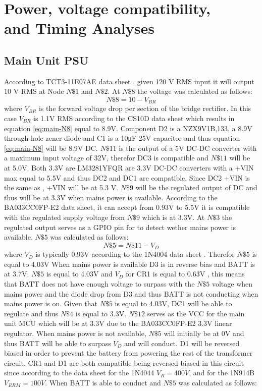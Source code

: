 \section{Power, voltage compatibility,\\ and Timing Analyses}
\subsection{Main Unit PSU}
According to TCT3-11E07AE data sheet \cite{TCT311E07AETriadMagnetics}, given 120 V RMS input it will output 10 V RMS at Node $N\$1$ and $N\$2$. At $N\$8$ the voltage was calculated as follows:
\begin{equation}
  N\$8 = 10 - V_{BR}
  \label{eq:main-N8}
\end{equation}
where $V_{BR}$ is the forward voltage drop per section of the bridge rectifier. In this case $V_{BR}$ is \num{1.1}\si{\V} RMS according to the CS10D data sheet \cite{CS10D} which results in equation \ref{eq:main-N8} equal to 8.9\si{\V}. Component D2 is a NZX9V1B,133, a 8.9\si{V} through hole zener diode and C1 is a 10\si{\micro\farad} 25V capacitor and thus equation \ref{eq:main-N8} will be 8.9\si{\V} DC. $N\$11$ is the output of a 5\si{\V} DC-DC converter with a maximum input voltage of 32\si{\V}, therefor DC3 is compatible and $N\$11$ will be at 5.0\si{\V}. Both 3.3\si{\V} are LM3281YFQR \cite{LM3281YFQR} are 3.3\si{\V} DC-DC converters with a +VIN max equal to 5.5\si{\V} and thus DC2 and DC1 are compatible. Since DC2 +VIN is the same as , +VIN will be at 5.3 V. $N\$9$ will be the regulated output of DC and thus will be at 3.3V when mains power is available. According to the BA033CC0FP-E2 data sheet, \cite{BA033CC0FPE2} it can accept from 0.93\si{\V} to 5.5\si{\V} it is compatible with the regulated supply voltage from $N\$9$ which is at 3.3\si{\V}. At $N\$3$ the regulated output serves as a GPIO pin for to detect wether mains power is available. $N\$5$ was calculated as follows:
\begin{equation}
  N\$5 =  N\$11 - V_{D}
  \label{eq:main-N5}
\end{equation}
where $V_{D}$ is typically 0.93\si{\V} according to the 1N4004 data sheet \cite{1N4004RLG}. Therefor $N\$5$ is equal to 4.03\si{\V}
When mains power is available D3 is in reverse bias and BATT is at 3.7\si{\V}. $N\$5$ is equal to 4.03\si{\V} and $V_{D}$ for CR1 is equal to 0.63\si{\V} \cite{1N914B}, this means that BATT does not have enough voltage to surpass with the $N\$5$ voltage when mains power and the diode drop from D3 and thus BATT is not conducting when mains power is on. Given that $N\$5$ is equal to 4.03\si{\V}, DC1 will be able to regulate and thus $N\$4$ is equal to 3.3\si{\V}. $N\$12$ serves as the VCC for the main unit MCU which will be at 3.3V due to the BA033CC0FP-E2 3.3V linear regulator. When mains power is not available, $N\$5$ will initially be at 0\si{\V} and thus BATT will be able to surpass $V_{D}$ and will conduct. D1 will be reversed biased in order to prevent the battery from powering the rest of the transformer circuit. CR1 and D1 are both compatible being reversed biased in this circuit since according to the data sheet for the 1N4044 \cite{1N4004RLG} $V_{R} = 400V$, and for the 1N914B $V_{RRM} = 100V$. When BATT is able to conduct and $N\$5$ was calculated as follows:

